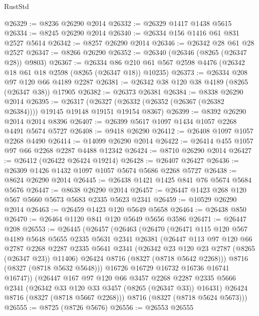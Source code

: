 \begin{lexlean}{RustStd}
\begin{coremodule}
@26329 := @8236 @26290 @2014
@26332 := @26329 @1417 @1438 @5615
@26334 := @8245 @26290 @2014
@26340 := @26334 @156 @1416 @61 @831 @2527 @5614
@26342 := @8257 @26290 @2014
@26346 := @26342 @28 @61 @28 @2527
@26347 := @8266 @26290
@26352 := @26340 (@26346 (@8265 (@26347 @28)) @9803)
@26367 := @26334
    @86
    @210
    @61
    @567
    @2598
    @4476
    (@26342 @18 @61 @18 @2598 (@8265 (@26347 @18)) @10235)
@26373 := @26334 @208 @97 @120 @66 @4189 @2287
@26381 := @26342 @38 @120 @38 @4189 (@8265 (@26347 @38)) @17905
@26382 := @26373 @26381
@26384 := @8338 @26290 @2014
@26395 := @26317
    (@26327 (@26332 (@26352 (@26367 (@26382 @26384)))) @19145 @19148 @19151 @19154 @8367)
@26399 := @8392 @26290 @2014 @2014 @8396
@26407 := @26399 @5617 @1097 @1434 @1057 @2268 @4491 @5674 @5727
@26408 := @9418 @26290
@26412 := @26408 @1097 @1057 @2268 @4490
@26414 := @14099 @26290 @2014
@26422 := @26414 @455 @1057 @97 @66 @2268 @2287 @4488 @12342
@26424 := @8710 @26290 @2014
@26427 := @26412 (@26422 @26424 @19214)
@26428 := @26407 @26427
@26436 := @26309 @1426 @1432 @1097 @1057 @5674 @5686 @2268 @5727
@26438 := @8624 @26290 @2014
@26445 := @26438 @1421 @1425 @841 @76 @5674 @5684 @5676
@26447 := @8638 @26290 @2014
@26457 := @26447 @1423 @268 @120 @567 @5660 @5673 @5683 @2335 @5623 @2341
@26459 := @10529 @26290 @2014
@26463 := @26459 @1423 @120 @5649 @5658
@26464 := @26438 @850
@26470 := @26464 @1120 @841 @120 @5649 @5656 @3586
@26471 := @26447 @208
@26553 := @26445
    (@26457
      (@26463
        (@26470
          (@26471
            @115
            @120
            @567
            @4189
            @5648
            @5655
            @2335
            @5631
            @2341
            @26381
            (@26447
              @113
              @97
              @120
              @66
              @2787
              @2268
              @2287
              @2335
              @5641
              @2341
              (@26342 @23 @120 @23 @2787 (@8265 (@26347 @23)) @11406)
              @26424
              @8716
              (@8327 (@8718 @5642 @2268)))
            @8716
            (@8327 (@8718 @5632 @5648)))
          @16726
          @16729
          @16732
          @16736
          @16741
          @16747))
      (@26447
        @167
        @97
        @120
        @66
        @3457
        @2268
        @2287
        @2335
        @5666
        @2341
        (@26342 @33 @120 @33 @3457 (@8265 (@26347 @33)) @16431)
        @26424
        @8716
        (@8327 (@8718 @5667 @2268)))
      @8716
      (@8327 (@8718 @5624 @5673)))
@26555 := @8725 (@8726 @5676)
@26556 := @26553 @26555

\end{coremodule}
\end{lexlean}
